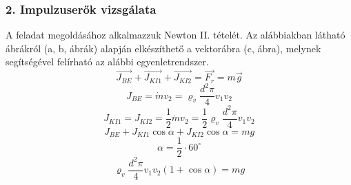 \subsubsection*{2. Impulzuserők vizsgálata}
A feladat megoldásához alkalmazzuk Newton II. tételét. Az alábbiakban látható ábrákról (a, b, ábrák) alapján elkészíthető a vektorábra (c, ábra), melynek segítségével felírható az alábbi egyenletrendszer. 
\begin{equation}
	\vec{J_{BE}} + \vec{J_{KI1}} + \vec{J_{KI2}} = \vec{F_r} = m \vec{g}
\end{equation}
\begin{equation}
	{J_{BE}} = \dot{m} v_2 = \varrho_v \frac{d^2 \pi}{4} v_1 v_2
\end{equation}
\begin{equation}
{J_{KI1}} = {J_{KI2}} = \frac{1}{2} \dot{m} v_2 = \frac{1}{2} \varrho_v \frac{d^2 \pi}{4} v_1 v_2
\end{equation}
\begin{equation}
{J_{BE}} + {J_{KI1}} \cos\alpha + {J_{KI2}} \cos\alpha = mg  
\end{equation}
\begin{equation}
\alpha = \frac{1}{2} \cdot 60^\circ
\end{equation}
\begin{equation}
\varrho_v \frac{d^2 \pi}{4} v_1 v_2 (1+\cos\alpha) = m g 
\end{equation}

